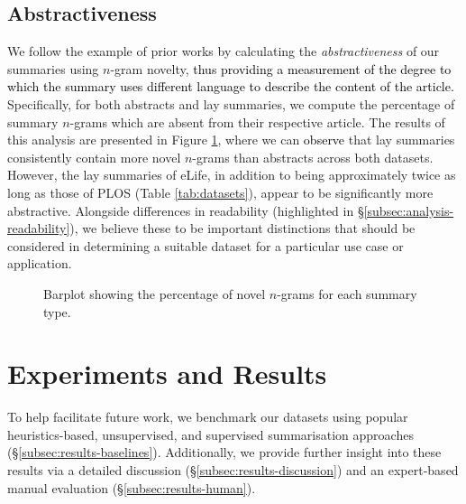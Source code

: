 \documentclass[11pt]{article}
\begin{document}
\subsection{Abstractiveness}  \label{subsec:analysis-abstractiveness}
We follow the example of prior works \citep{Sharma2019-ue, See2017-ve} by calculating the \textit{abstractiveness} of our summaries using $n$-gram novelty,
\textcolor{black}{thus providing a measurement of the degree to which the summary uses different language to describe the content of the article.}
Specifically, for both abstracts and lay summaries, we compute the percentage of summary $n$-grams which are absent from their respective article. The results of this analysis are presented in Figure \ref{fig:novel_ngrams}, where we can \textcolor{black}{observe} that lay summaries consistently contain more novel $n$-grams than abstracts across both datasets. However, the lay summaries of eLife, in addition to being approximately twice as long as those of PLOS (Table \ref{tab:datasets}), appear to be significantly more abstractive. 
Alongside differences in readability (highlighted in \S\ref{subsec:analysis-readability}), we believe these to be important distinctions that should be considered in determining a suitable dataset for a particular use case or application.

\begin{figure}[t]
    \centering
    \caption{Barplot showing the percentage of novel $n$-grams for each summary type.}
    \label{fig:novel_ngrams}
\end{figure}


 \section{Experiments and Results} \label{sec:exp}

To help facilitate future work, we benchmark our datasets using popular heuristics-based, unsupervised, and supervised summarisation approaches  (\S\ref{subsec:results-baselines}). Additionally, we provide further insight into these results via a detailed discussion (\S\ref{subsec:results-discussion}) and an expert-based manual evaluation (\S\ref{subsec:results-human}).   
\end{document}

